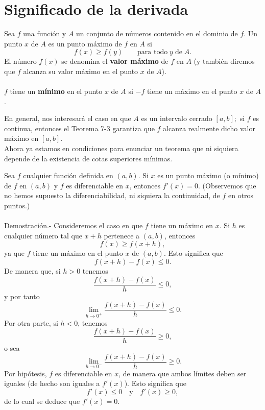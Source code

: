 \chapter{Significado de la derivada}

    \begin{def.}
	Sea $f$ una función y $A$ un conjunto de números contenido en el dominio de $f$. Un punto $x$ de $A$ es un punto máximo de $f$ en $A$ si
	$$f(x)\geq f(y)\qquad \mbox{para todo} \; y \; \mbox{de}\; A.$$
	El número $f(x)$ se denomina el \textbf{valor máximo} de $f$ en $A$ (y también diremos que $f$ alcanza su valor máximo en el punto $x$ de $A$).\\\\
	$f$ tiene un \textbf{mínimo} en el punto $x$ de $A$ si $-f$ tiene un máximo en el punto $x$ de $A$.
    \end{def.}

En general, nos interesará el caso en que $A$ es un intervalo cerrado $[a,b];$ si $f$ es continua, entonces el Teorema 7-3 garantiza que $f$ alcanza realmente dicho valor máximo en $[a,b].$\\

Ahora ya estamos en condiciones para enunciar un teorema que ni siquiera depende de la existencia de cotas superiores mínimas.\\

\begin{teo}
    Sea $f$ cualquier función definida en $(a,b)$. Si $x$ es un punto máximo (o mínimo) de $f$ en $(a,b)$ y $f$ es diferenciable en $x$, entonces $f'(x)=0.$ (Observemos que no hemos supuesto la diferenciabilidad, ni siquiera la continuidad, de $f$ en otros puntos.)\\\\
	Demostración.-\; Consideremos el caso en que $f$ tiene un máximo en $x$. Si $h$ es cualquier número tal que $x+h$ pertenece a $(a,b)$, entonces
	$$f(x)\geq f(x+h),$$
	ya que $f$ tiene un máximo en el punto $x$ de $(a,b)$. Esto significa que 
	$$f(x+h)-f(x)\leq 0.$$
	De manera que, si $h>0$ tenemos
	$$\dfrac{f(x+h)-f(x)}{h}\leq 0,$$
	y por tanto
	$$\lim_{h\to 0^+}\dfrac{f(x+h)-f(x)}{h}\leq 0.$$
	Por otra parte, si $h<0$, tenemos
	$$\dfrac{f(x+h)-f(x)}{h}\geq 0,$$
	o sea
	$$\lim_{h\to 0^-}\dfrac{f(x+h)-f(x)}{h}\geq 0.$$
	Por hipótesis, $f$ es diferenciable en $x$, de manera que ambos límites deben ser iguales (de hecho son iguales a $f'(x)$). Esto significa que
	$$f'(x)\leq 0\quad \mbox{y}\quad f'(x)\geq 0,$$
	de lo cual se deduce que $f'(x)=0.$\\
\end{teo}

